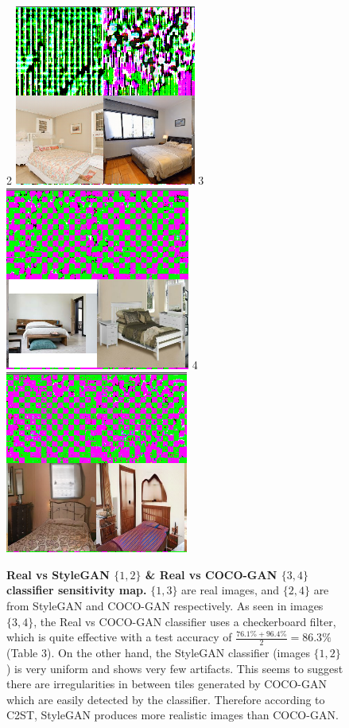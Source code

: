 \documentclass{article}
\begin{document}
\begin{figure}[H]
            2
            \includegraphics[scale=0.25]{smoothgrad/stylegan/stylegan.png}
            3
            \includegraphics[scale=0.25]{smoothgrad/coco/real.png}
            4
            \includegraphics[scale=0.25]{smoothgrad/coco/coco.png}
          \caption{\textbf{Real vs StyleGAN $\{1, 2\}$ \& Real vs COCO-GAN $\{3, 4\}$ classifier sensitivity map.} $\{1, 3\}$ are real images, and $\{2, 4\}$ are from StyleGAN and COCO-GAN respectively. As seen in images $\{3, 4\}$, the Real vs COCO-GAN classifier uses a checkerboard filter, which is quite effective with a test accuracy of $\frac{76.1\% + 96.4\%}{2} = 86.3\%$ (Table 3). 
          On the other hand, the StyleGAN classifier (images $\{1, 2\}$) is very uniform and shows very few artifacts.
        This seems to suggest there are irregularities in between tiles generated by COCO-GAN which are easily detected by the classifier.
        Therefore according to C2ST, StyleGAN produces more realistic images than COCO-GAN.}
        \end{figure}
        
\end{document}
